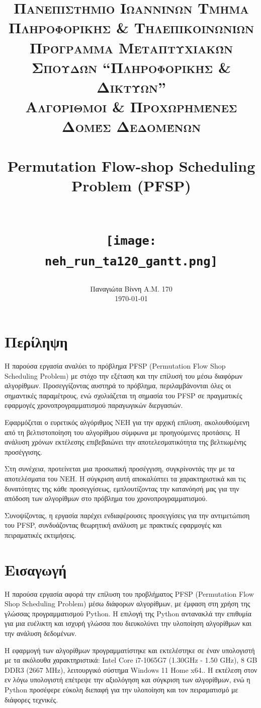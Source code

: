 \documentclass[paper=a4, fontsize=11pt]{scrartcl}
\title{
     \usefont{OT1}{bch}{b}{n}
     \normalfont \normalsize \textsc{Πανεπιστήμιο Ιωαννίνων Τμήμα Πληροφορικής \& Τηλεπικοινωνίων} \\ [1em]
     \normalfont \normalsize \textsc{Πρόγραμμα Μεταπτυχιακών Σπουδών “Πληροφορικής \& Δικτύων”} \\ [1em]
     \normalfont \normalsize \textsc{Αλγόριθμοι \& Προχωρημένες Δομές Δεδομένων} \\ [1em]
     \horrule{0.5pt} \\[0.4cm]
     \huge Permutation Flow-shop Scheduling Problem (PFSP) \\
     \horrule{2pt} \\[0.5cm]

     \begin{figure}[h]
        \centering
        \texttt{[image: neh\_run\_ta120\_gantt.png]}
        \label{fig:header}
    \end{figure}
}
\author{
    \normalfont
         Παναγιώτα Βίννη  Α.Μ. 170\\[-1pt]
         \today
}
\date{}
\numberwithin{equation}{section}		%
\numberwithin{figure}{section}			%
\numberwithin{table}{section}				%
\begin{document}
\maketitle

\newpage
\tableofcontents
\vspace{1cm}
\listoffigures
\newpage

\newline
\section{Περίληψη}

    Η παρούσα εργασία αναλύει το πρόβλημα PFSP (Permutation Flow Shop Scheduling Problem) με στόχο την εξέταση και την επίλυσή του μέσω διαφόρων αλγορίθμων. Προσεγγίζοντας αυστηρά το πρόβλημα, περιλαμβάνονται όλες οι σημαντικές παραμέτρους, ενώ σχολιάζεται τη σημασία του PFSP σε πραγματικές εφαρμογές χρονοπρογραμματισμού παραγωγικών διεργασιών.
    
    Εφαρμόζεται ο ευρετικός αλγόριθμος NEH για την αρχική επίλυση, ακολουθούμενη από τη βελτιστοποίηση του αλγορίθμου σύμφωνα με προηγούμενες προτάσεις. Η ανάλυση χρόνων εκτέλεσης επιβεβαιώνει την αποτελεσματικότητα της βελτιωμένης προσέγγισης.
    
    Στη συνέχεια, προτείνεται μια προσωπική προσέγγιση, συγκρίνοντάς την με τα αποτελέσματα του NEH. Η σύγκριση αυτή αποκαλύπτει τα χαρακτηριστικά και τις δυνατότητες της κάθε προσεγγίσεως, εμπλουτίζοντας την κατανόησή μας για την απόδοση των αλγορίθμων στο πρόβλημα του χρονοπρογραμματισμού.
    
    Συνοψίζοντας, η εργασία παρέχει ενδιαφέρουσες προσεγγίσεις για την αντιμετώπιση του PFSP, συνδυάζοντας θεωρητική ανάλυση με πρακτικές εφαρμογές και πειραματικές εκτιμήσεις.

\newpage
\section{Εισαγωγή}

    Η παρούσα εργασία αφορά την επίλυση του προβλήματος PFSP (Permutation Flow Shop Scheduling Problem) μέσω διάφορων αλγορίθμων, με έμφαση στη χρήση της γλώσσας προγραμματισμού Python. Η επιλογή της Python αντανακλά την επιθυμία για μια ευέλικτη και ισχυρή γλώσσα που διευκολύνει την υλοποίηση αλγορίθμων και την ανάλυση δεδομένων.

    Η εφαρμογή των αλγορίθμων προγραμματίστηκε και εκτελέστηκε σε έναν υπολογιστή με τα ακόλουθα χαρακτηριστικά: Intel Core i7-1065G7 (1.30GHz - 1.50 GHz), 8 GB DDR3 (2667 MHz), λειτουργικό σύστημα Windows 11 Home x64.. Η εκτέλεση στον εν λόγω υπολογιστή επέτρεψε την αξιολόγηση και σύγκριση των αλγορίθμων, ενώ η Python προσέφερε εύκολη διεπαφή για την υλοποίηση και τον πειραματισμό με διάφορες τεχνικές.
    
\end{document}
